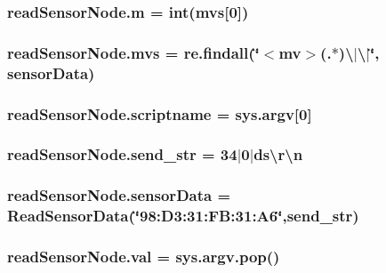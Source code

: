 \subsubsection[{\texorpdfstring{m}{m}}]{\setlength{\rightskip}{0pt plus 5cm}read\+Sensor\+Node.\+m = int({\bf mvs}\mbox{[}0\mbox{]})}\hypertarget{namespacereadSensorNode_a71804d993bcdc7ce54f096240e107167}{}\label{namespacereadSensorNode_a71804d993bcdc7ce54f096240e107167}
\subsubsection[{\texorpdfstring{mvs}{mvs}}]{\setlength{\rightskip}{0pt plus 5cm}read\+Sensor\+Node.\+mvs = re.\+findall(\char`\"{}$<$mv$>$(.$\ast$)\textbackslash{}$\vert$\textbackslash{}$\vert$\char`\"{}, sensor\+Data)}\hypertarget{namespacereadSensorNode_a7746a922c2180be4998ed3a6f2ea55c6}{}\label{namespacereadSensorNode_a7746a922c2180be4998ed3a6f2ea55c6}
\subsubsection[{\texorpdfstring{scriptname}{scriptname}}]{\setlength{\rightskip}{0pt plus 5cm}read\+Sensor\+Node.\+scriptname = sys.\+argv\mbox{[}0\mbox{]}}\hypertarget{namespacereadSensorNode_acade05a74d18b0ee0e6f280ad09d687f}{}\label{namespacereadSensorNode_acade05a74d18b0ee0e6f280ad09d687f}
\subsubsection[{\texorpdfstring{send\+\_\+str}{send_str}}]{\setlength{\rightskip}{0pt plus 5cm}read\+Sensor\+Node.\+send\+\_\+str = \textquotesingle{}34$\vert$0$\vert$ds\textbackslash{}r\textbackslash{}n\textquotesingle{}}\hypertarget{namespacereadSensorNode_af709b4a0649a2ea9861b259a849678b4}{}\label{namespacereadSensorNode_af709b4a0649a2ea9861b259a849678b4}
\subsubsection[{\texorpdfstring{sensor\+Data}{sensorData}}]{\setlength{\rightskip}{0pt plus 5cm}read\+Sensor\+Node.\+sensor\+Data = Read\+Sensor\+Data(\char`\"{}98\+:D3\+:31\+:\+F\+B\+:31\+:\+A6\char`\"{},send\+\_\+str)}\hypertarget{namespacereadSensorNode_ad6357a640d5eeb83da28688160844249}{}\label{namespacereadSensorNode_ad6357a640d5eeb83da28688160844249}
\subsubsection[{\texorpdfstring{val}{val}}]{\setlength{\rightskip}{0pt plus 5cm}read\+Sensor\+Node.\+val = sys.\+argv.\+pop()}\hypertarget{namespacereadSensorNode_a6402c2b5b9511b1753751a57999229db}{}\label{namespacereadSensorNode_a6402c2b5b9511b1753751a57999229db}
